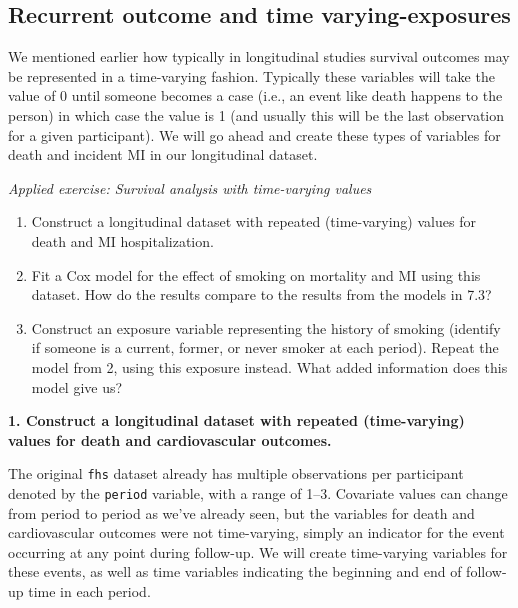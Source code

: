 \documentclass[
]{book}
\providecommand{\tightlist}{%
  \setlength{\itemsep}{0pt}\setlength{\parskip}{0pt}}
\begin{document}
\subsection{Recurrent outcome and time varying-exposures}\label{recurrent-outcome-and-time-varying-exposures}

We mentioned earlier how typically in longitudinal studies survival outcomes may be represented in a time-varying fashion. Typically these variables will take the value of 0 until someone becomes a case (i.e., an event like death happens to the person) in which case the value is 1 (and usually this will be the last observation for a given participant). We will go ahead and create these types of variables for death and incident MI in our longitudinal dataset.

\emph{Applied exercise: Survival analysis with time-varying values}

\begin{enumerate}
\def\labelenumi{\arabic{enumi}.}
\tightlist
\item
  Construct a longitudinal dataset with repeated (time-varying) values for death and MI hospitalization.
\item
  Fit a Cox model for the effect of smoking on mortality and MI using this dataset. How do the results compare to the results from the models in 7.3?
\item
  Construct an exposure variable representing the history of smoking (identify if someone is a current, former, or never smoker at each period). Repeat the model from 2, using this exposure instead. What added information does this model give us?
\end{enumerate}

\textbf{1. Construct a longitudinal dataset with repeated (time-varying) values for death and cardiovascular outcomes.}

The original \texttt{fhs} dataset already has multiple observations per participant denoted by the \texttt{period} variable, with a range of 1--3. Covariate values can change from period to period as we've already seen, but the variables for death and cardiovascular outcomes were not time-varying, simply an indicator for the event occurring at any point during follow-up. We will create time-varying variables for these events, as well as time variables indicating the beginning and end of follow-up time in each period.
\end{document}
